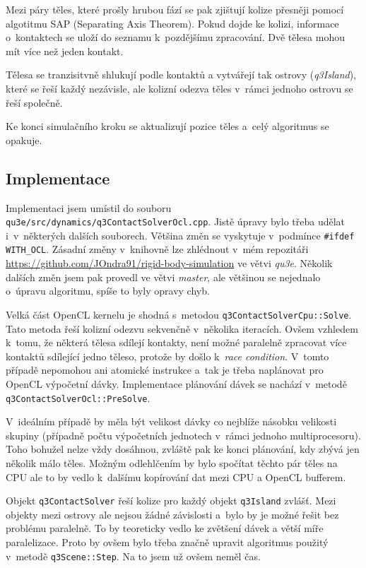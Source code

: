 \documentclass[11pt,a4paper]{article}
\begin{document}
Mezi páry těles, které prošly hrubou fází se pak zjištují kolize přesněji pomocí
algotitmu SAP (Separating Axis Theorem). Pokud dojde ke kolizi, informace
o~kontaktech se uloží do seznamu k~pozdějšímu zpracování. Dvě tělesa mohou
mít více než jeden kontakt.

Tělesa se tranzisitvně shlukují podle kontaktů a vytvářejí tak ostrovy
(\textit{q3Island}), které se řeší každý nezávisle, ale kolizní
odezva těles v~rámci jednoho ostrovu se řeší společně.

Ke konci simulačního kroku se aktualizují pozice těles a~celý algoritmus se opakuje.

\subsection{Implementace}

Implementaci jsem umístil do souboru \texttt{qu3e/src/dynamics/q3ContactSolverOcl.cpp}.
Jistě úpravy bylo třeba udělat i~v~některých dalších souborech.
Většina změn se vyskytuje v~podmínce \texttt{\#ifdef WITH\_OCL}.
Zásadní změny v~knihovně lze zhlédnout v~mém repozitáři
\url{https://github.com/JOndra91/rigid-body-simulation} ve větvi \textit{qu3e}.
Několik dalších změn jsem pak provedl ve větvi \textit{master}, ale většinou
se nejednalo o~úpravu algoritmu, spíše to byly opravy chyb.

Velká část OpenCL kernelu je shodná s~metodou \texttt{q3ContactSolverCpu::Solve}.
Tato metoda řeší kolizní odezvu sekvenčně v~několika iteracích.
Ovšem vzhledem k~tomu, že některá tělesa sdílejí kontakty, není možné paralelně
zpracovat více kontaktů sdílející jedno těleso, protože by došlo
k~\textit{race condition}. V~tomto případě nepomohou ani atomické instrukce a~tak
je třeba naplánovat pro OpenCL výpočetní dávky. Implementace plánování
dávek se nachází v~metodě \texttt{q3ContactSolverOcl::PreSolve}.

V~ideálním případě by měla být velikost dávky co nejblíže násobku velikosti
skupiny (případně počtu výpočetních jednotech v~rámci jednoho multiprocesoru).
Toho bohužel nelze vždy dosáhnou, zvláště pak ke konci plánování, kdy zbývá jen
několik málo těles. Možným odlehlčením by bylo spočítat těchto pár těles na CPU
ale to by vedlo k~dalšímu kopírování dat mezi CPU a OpenCL bufferem.

Objekt \texttt{q3ContactSolver} řeší kolize pro každý objekt \texttt{q3Island}
zvlášť. Mezi objekty mezi ostrovy ale nejsou žádné závislosti a~bylo by je možné
řešit bez problému paralelně. To by teoreticky vedlo ke zvětšení dávek
a větší míře paralelizace. Proto by ovšem bylo třeba značně upravit algoritmus
použitý v~metodě \texttt{q3Scene::Step}. Na to jsem už ovšem neměl čas.
\end{document}
